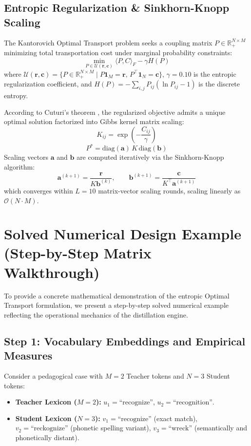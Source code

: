 \subsection{Entropic Regularization & Sinkhorn-Knopp Scaling}
The Kantorovich Optimal Transport problem seeks a coupling matrix $P \in \mathbb{R}_+^{N \times M}$ minimizing total transportation cost under marginal probability constraints:
\begin{equation}
    \min_{P \in \mathcal{U}(\mathbf{r}, \mathbf{c})} \langle P, C \rangle_F - \gamma H(P)
\end{equation}
where $\mathcal{U}(\mathbf{r}, \mathbf{c}) = \{P \in \mathbb{R}_+^{N \times M} \mid P \mathbf{1}_M = \mathbf{r}, \, P^\top \mathbf{1}_N = \mathbf{c}\}$, $\gamma = 0.10$ is the entropic regularization coefficient, and $H(P) = - \sum_{i,j} P_{ij} (\ln P_{ij} - 1)$ is the discrete entropy.

According to Cuturi's theorem \cite{cuturi2013sinkhorn}, the regularized objective admits a unique optimal solution factorized into Gibbs kernel matrix scaling:
\begin{equation}
    K_{ij} = \exp\left(-\frac{C_{ij}}{\gamma}\right)
\end{equation}
\begin{equation}
    P^* = \text{diag}(\mathbf{a}) \, K \, \text{diag}(\mathbf{b})
\end{equation}
Scaling vectors $\mathbf{a}$ and $\mathbf{b}$ are computed iteratively via the Sinkhorn-Knopp algorithm:
\begin{equation}
    \mathbf{a}^{(k+1)} = \frac{\mathbf{r}}{K \mathbf{b}^{(k)}}, \qquad \mathbf{b}^{(k+1)} = \frac{\mathbf{c}}{K^\top \mathbf{a}^{(k+1)}}
\end{equation}
which converges within $L = 10$ matrix-vector scaling rounds, scaling linearly as $\mathcal{O}(N \cdot M)$.

\section{Solved Numerical Design Example (Step-by-Step Matrix Walkthrough)}
To provide a concrete mathematical demonstration of the entropic Optimal Transport formulation, we present a step-by-step solved numerical example reflecting the operational mechanics of the distillation engine.

\subsection{Step 1: Vocabulary Embeddings and Empirical Measures}
Consider a pedagogical case with $M = 2$ Teacher tokens and $N = 3$ Student tokens:
\begin{itemize}
    \item \textbf{Teacher Lexicon ($M=2$):} $u_1 = \text{``recognize''}$, $u_2 = \text{``recognition''}$.
    \item \textbf{Student Lexicon ($N=3$):} $v_1 = \text{``recognize''}$ (exact match), $v_2 = \text{``reckognize''}$ (phonetic spelling variant), $v_3 = \text{``wreck''}$ (semantically and phonetically distant).
\end{itemize}

